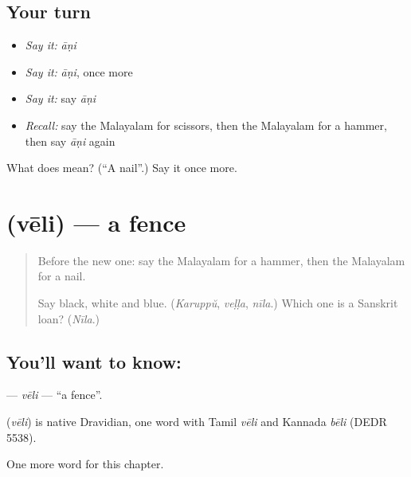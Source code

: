 \subsection*{Your turn}
\begin{itemize}
\raggedright
  \item \emph{Say it:} \emph{āṇi}
  \item \emph{Say it:} \emph{āṇi}, once more
  \item \emph{Say it:} say \emph{āṇi}
  \item \emph{Recall:} say the Malayalam for scissors, then the Malayalam for a hammer, then say \emph{āṇi} again
\end{itemize}

\begin{tcolorbox}[breakable,colback=teal!4,colframe=teal!35!black,title={Before you move on}]
What does  mean? (\textquotedblleft{}A nail\textquotedblright{}.) Say it once more.
\end{tcolorbox}
\section[\texorpdfstring{\ml{വേലി} (vēli)}{വേലി (vēli)}]{ (vēli) — a fence}

\label{lesson:ML-C159-veli}



\begin{quote}
Before the new one: say the Malayalam for a hammer, then the Malayalam for a nail.

Say black, white and blue. (\emph{Karuppŭ}, \emph{veḷḷa}, \emph{nīla}.) Which one is a Sanskrit loan? (\emph{Nīla}.)
\end{quote}

\subsection*{You'll want to know: }
\textbf{} — \emph{vēli} — \textquotedblleft{}a fence\textquotedblright{}.

\begin{cousinweb}
\textbf{} (\emph{vēli}) is native Dravidian, one word with Tamil \emph{vēli} and Kannada \emph{bēli} (DEDR 5538).
\end{cousinweb}

\begin{grammarlens}[title={What you've built}]
One more word for this chapter.
\end{grammarlens}

